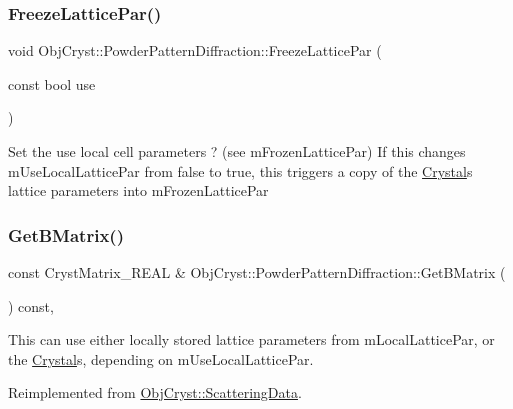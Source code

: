 \subsubsection{\texorpdfstring{FreezeLatticePar()}{FreezeLatticePar()}}
{\footnotesize\ttfamily void Obj\+Cryst\+::\+Powder\+Pattern\+Diffraction\+::\+Freeze\+Lattice\+Par (\begin{DoxyParamCaption}\item[{const bool}]{use }\end{DoxyParamCaption})}

Set the use local cell parameters ? (see m\+Frozen\+Lattice\+Par) If this changes m\+Use\+Local\+Lattice\+Par from false to true, this triggers a copy of the \mbox{\hyperlink{class_obj_cryst_1_1_crystal}{Crystal}}\textquotesingle{}s lattice parameters into m\+Frozen\+Lattice\+Par \mbox{\label{class_obj_cryst_1_1_powder_pattern_diffraction_ac2079a53e2f3655ea04aa79474dfb970}} 
\subsubsection{\texorpdfstring{GetBMatrix()}{GetBMatrix()}}
{\footnotesize\ttfamily const Cryst\+Matrix\+\_\+\+R\+E\+AL \& Obj\+Cryst\+::\+Powder\+Pattern\+Diffraction\+::\+Get\+B\+Matrix (\begin{DoxyParamCaption}{ }\end{DoxyParamCaption}) const\hspace{0.3cm}{\ttfamily [protected]}, {\ttfamily [virtual]}}

This can use either locally stored lattice parameters from m\+Local\+Lattice\+Par, or the \mbox{\hyperlink{class_obj_cryst_1_1_crystal}{Crystal}}\textquotesingle{}s, depending on m\+Use\+Local\+Lattice\+Par. 

Reimplemented from \mbox{\hyperlink{class_obj_cryst_1_1_scattering_data_abd28bb9c58ba25cc61cb138cab3df5de}{Obj\+Cryst\+::\+Scattering\+Data}}.

